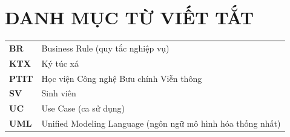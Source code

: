 \chapter*{DANH MỤC TỪ VIẾT TẮT}
{}

\begin{center}
\begin{tabularx}{0.9\textwidth}{>{\bfseries}p{}X}
BR & Business Rule (quy tắc nghiệp vụ) \\
KTX & Ký túc xá \\
PTIT & Học viện Công nghệ Bưu chính Viễn thông \\
SV & Sinh viên \\
UC & Use Case (ca sử dụng) \\
UML & Unified Modeling Language (ngôn ngữ mô hình hóa thống nhất) \\
\end{tabularx}
\end{center}
